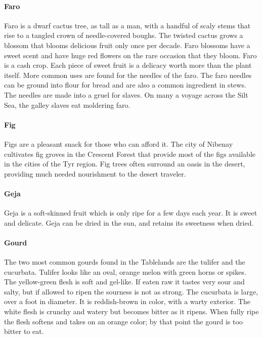 \begin{multicols}{2}
\paragraph{Faro} Faro is a dwarf cactus tree, as tall as a man, with a handful of scaly stems that rise to a tangled crown of needle-covered boughs. The twisted cactus grows a blossom that blooms delicious fruit only once per decade. Faro blossoms have a sweet scent and have huge red flowers on the rare occasion that they bloom. Faro is a cash crop. Each piece of sweet fruit is a delicacy worth more than the plant itself. More common uses are found for the needles of the faro. The faro needles can be ground into flour for bread and are also a common ingredient in stews. The needles are made into a gruel for slaves. On many a voyage across the Silt Sea, the galley slaves eat moldering faro.\\
\paragraph{Fig} Figs are a pleasant snack for those who can afford it. The city of Nibenay cultivates fig groves in the Crescent Forest that provide most of the figs available in the cities of the Tyr region. Fig trees often surround an oasis in the desert, providing much needed nourishment to the desert traveler.\\
\paragraph{Geja} Geja is a soft-skinned fruit which is only ripe for a few days each year. It is sweet and delicate. Geja can be dried in the sun, and retains its sweetness when dried.\\
\paragraph{Gourd} The two most common gourds found in the Tablelands are the tulifer and the cucurbata. Tulifer looks like an oval, orange melon with green horns or spikes. The yellow-green flesh is soft and gel-like. If eaten raw it tastes very sour and salty, but if allowed to ripen the sourness is not as strong. The cucurbata is large, over a foot in diameter. It is reddish-brown in color, with a warty exterior. The white flesh is crunchy and watery but becomes bitter as it ripens. When fully ripe the flesh softens and takes on an orange color; by that point the gourd is too bitter to eat.\\

\end{multicols}
